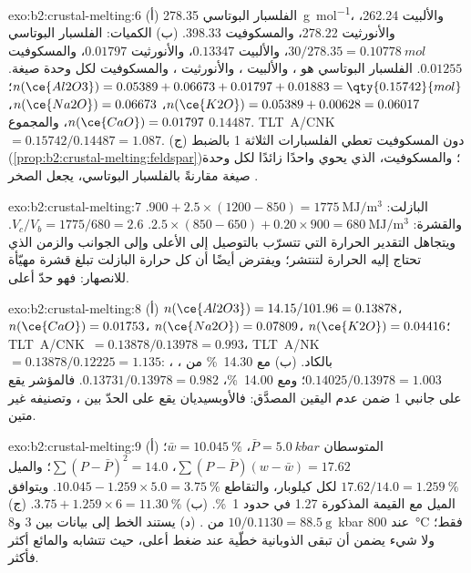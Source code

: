 \begin{solution}{exo:b2:crustal-melting:6}
(أ) الفلسبار البوتاسي \qty{278.35}{\gram\per\mole}، والألبيت 262.24، والأنورثيت 278.22، والمسكوفيت
398.33. (ب) الكميات: الفلسبار البوتاسي $30/278.35 = \qty{0.10778}{mol}$، والألبيت $0.13347$،
والأنورثيت $0.01797$، والمسكوفيت $0.01255$. الفلسبار البوتاسي هو ،
والألبيت ، والأنورثيت ، والمسكوفيت
 لكل وحدة صيغة. $n(\ce{Al2O3}) = 0.05389 +
0.06673 + 0.01797 + 0.01883 = \qty{0.15742}{mol}$؛ $n(\ce{K2O}) = 0.05389 + 0.00628 =
0.06017$، $n(\ce{Na2O}) = 0.06673$، $n(\ce{CaO}) = 0.01797$، والمجموع $0.14487$.
\mbox{\textdir TLT A/CNK $= 0.15742/0.14487 = 1.087$}. (ج) دون المسكوفيت تعطي الفلسبارات الثلاثة
1 بالضبط (\cref{prop:b2:crustal-melting:feldspar})؛ والمسكوفيت، الذي يحوي  واحدًا
زائدًا لكل وحدة صيغة مقارنةً بالفلسبار البوتاسي، يجعل الصخر .
\end{solution}

\begin{solution}{exo:b2:crustal-melting:7}
البازلت: $900 + 2.5\times(1200 - 850) = \qty{1775}{\mega\joule\per\cubic\metre}$. والقشرة:
$2.5\times(850 - 650) + 0.20\times900 = \qty{680}{\mega\joule\per\cubic\metre}$.
$V_c/V_b = 1775/680 = 2.6$. ويتجاهل التقدير الحرارة التي تتسرّب بالتوصيل
إلى الأعلى وإلى الجوانب والزمن الذي تحتاج إليه الحرارة لتنتشر؛ ويفترض أيضًا أن كل
حرارة البازلت تبلغ قشرة مهيّأة للانصهار: فهو حدّ أعلى.
\end{solution}

\begin{solution}{exo:b2:crustal-melting:8}
(أ) $n(\ce{Al2O3}) = 14.15/101.96 = 0.13878$، $n(\ce{CaO}) = 0.01753$، $n(\ce{Na2O}) =
0.07809$، $n(\ce{K2O}) = 0.04416$؛ \mbox{\textdir TLT A/CNK $= 0.13878/0.13978 = 0.993$}، \mbox{\textdir TLT A/NK $=
0.13878/0.12225 = 1.135$}: ، بالكاد. (ب) مع \qty{14.30}{\percent} من ،
$0.14025/0.13978 = 1.003$؛ ومع \qty{14.00}{\percent}، $0.13731/0.13978 = 0.982$. فالمؤشر
يقع على جانبي 1 ضمن عدم اليقين المصدَّق: فالأوبسيديان يقع على
الحدّ بين  ، وتصنيفه غير متين.
\end{solution}

\begin{solution}{exo:b2:crustal-melting:9}
(أ) المتوسطان $\bar P = \qty{5.0}{kbar}$، $\bar w = \qty{10.045}{\percent}$؛
$\sum(P - \bar P)(w - \bar w) = 17.62$، $\sum(P - \bar P)^2 = 14.0$؛ والميل
$17.62/14.0 = \qty{1.259}{\percent}$ لكل كيلوبار، والتقاطع $10.045 - 1.259\times5.0 =
\qty{3.75}{\percent}$. ويتوافق الميل مع القيمة المذكورة 1.27 في حدود
\qty{1}{\percent}. (ب) $3.75 + 1.259\times6 = \qty{11.30}{\percent}$. (ج) $10/0.1130 =
\qty{88.5}{\gram}$ من . (د) يستند الخط إلى بيانات بين 3 و\qty{8}{kbar} عند
\qty{800}{\celsius} فقط؛ ولا شيء يضمن أن تبقى الذوبانية خطّية عند ضغط
أعلى، حيث تتشابه  والمائع أكثر فأكثر.
\end{solution}

